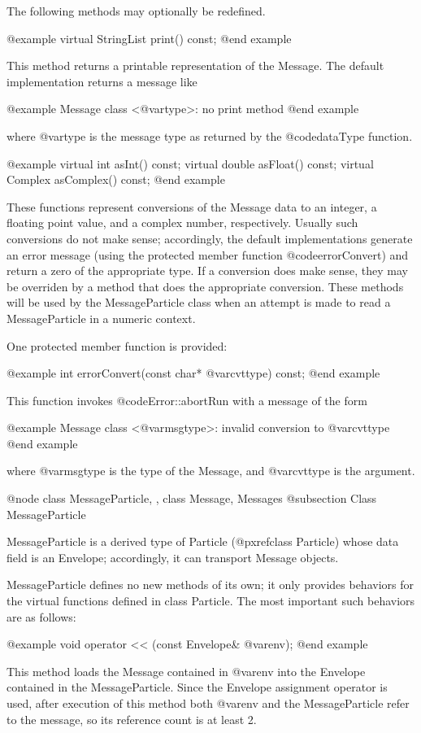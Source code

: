 The following methods may optionally be redefined.

@example
virtual StringList print() const;
@end example

This method returns a printable representation of the Message.
The default implementation returns a message like

@example
Message class <@var{type}>: no print method
@end example

where @var{type} is the message type as returned by the @code{dataType}
function.

@example
virtual int asInt() const;
virtual double asFloat() const;
virtual Complex asComplex() const;
@end example

These functions represent conversions of the Message data to an integer,
a floating point value, and a complex number, respectively.  Usually
such conversions do not make sense; accordingly, the default
implementations generate an error message (using the protected member
function @code{errorConvert}) and return a zero of the appropriate type.
If a conversion does make sense, they may be overriden by a method that
does the appropriate conversion.  These methods will be used by the
MessageParticle class when an attempt is made to read a MessageParticle
in a numeric context.

One protected member function is provided:

@example
int errorConvert(const char* @var{cvttype}) const;
@end example

This function invokes @code{Error::abortRun} with a message of the
form

@example
Message class <@var{msgtype}>: invalid conversion to @var{cvttype}
@end example

where @var{msgtype} is the type of the Message, and @var{cvttype} is
the argument.

@node class MessageParticle,  , class Message, Messages
@subsection Class MessageParticle

MessageParticle is a derived type of Particle (@pxref{class Particle})
whose data field is an
Envelope; accordingly, it can transport Message objects.

MessageParticle defines no new methods of its own; it only provides
behaviors for the virtual functions defined in class Particle.
The most important such behaviors are as follows:

@example
void operator << (const Envelope& @var{env});
@end example

This method loads the Message contained in @var{env} into the Envelope
contained in the MessageParticle.  Since the Envelope assignment
operator is used, after execution of this method both @var{env} and
the MessageParticle refer to the message, so its reference count is at
least 2.

